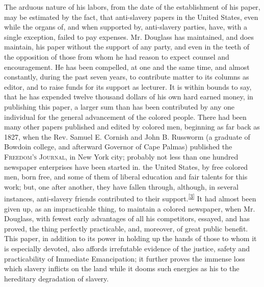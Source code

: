 The arduous nature of his labors, from the date of the establishment of
his paper, may be estimated by the fact, that anti-slavery papers in the
United States, even while the organs of, and when supported by,
anti-slavery parties, have, with a single exception, failed to pay
expenses. Mr. Douglass has maintained, and does maintain, his paper
without the support of any party, and even in the teeth of the
opposition of those from whom he had reason to expect counsel and
encouragement. He has been compelled, at one and the same time, and
almost constantly, during the past seven years, to contribute matter to
its columns as editor, and to raise funds for its support as lecturer.
It is within bounds to say, that he has expended twelve thousand dollars
of his own hard earned money, in publishing this paper, a larger sum
than has been contributed by any one individual for the general
advancement of the colored people. There had been many other papers
published and edited by colored men, beginning as far back as 1827, when
the Rev. Samuel E. Cornish and John B. Russworm (a graduate of Bowdoin
college, and afterward Governor of Cape Palmas) published the
\textsc{Freedom's Journal}, in New York city; probably not less than one
hundred newspaper enterprises have been started in. the United States,
by free colored men, born free, and some of them of liberal education
and fair talents for this work; but, one after another, they have fallen
through, although, in several instances, anti-slavery {}friends
contributed to their
support.\textsuperscript{\protect\hyperlink{cite_note-3}{{[}3{]}}} It
had almost been given up, as an impracticable thing, to maintain a
colored newspaper, when Mr. Douglass, with fewest early advantages of
all his competitors, essayed, and has proved, the thing perfectly
practicable, and, moreover, of great public benefit. This paper, in
addition to its power in holding up the hands of those to whom it is
especially devoted, also affords irrefutable evidence of the justice,
safety and practicability of Immediate Emancipation; it further proves
the immense loss which slavery inflicts on the land while it dooms such
energies as his to the hereditary degradation of slavery.

